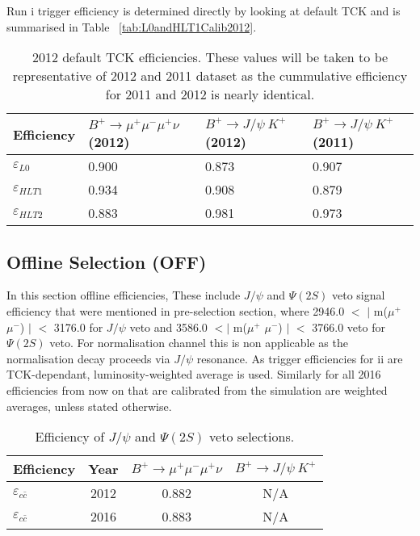 Run \Rn{1} trigger efficiency is determined directly by looking at default TCK and is summarised in Table ~\autoref{tab:L0andHLT1Calib2012}. 



\begin{table}[H]
\begin{center}
\begin{tabular}{ l  l  l  l  }
 Efficiency &  $B^{+} \rightarrow \mu^{+} \mu^{-} \mu^{+} \nu$  (2012)  &  $B^{+} \rightarrow J/\psi\ K^{+}$ (2012) & $B^{+} \rightarrow J/\psi\ K^{+}$ (2011) \\
\hline
$\varepsilon_{L0}$ &0.900 & 0.873 & 0.907 \\
$\varepsilon_{HLT1}$ &0.934 & 0.908 & 0.879 \\
$\varepsilon_{HLT2}$ &0.883 & 0.981 & 0.973 \\
\hline
\end{tabular}
\end{center}
\caption{2012 default TCK efficiencies. These values will be taken to be representative of 2012 and 2011 dataset as the cummulative efficiency for 2011 and 2012 is nearly identical.}
\label{tab:L0andHLT1Calib2012}
\end{table}


\subsection{Offline Selection (OFF)}

In this section offline efficiencies, These include $J/\psi$ and $\Psi(2S)$ veto signal efficiency that were mentioned in pre-selection section, where 2946.0 $<$ $|$ m($\mu^{+}$ $\mu^{-}$) $|$ $<$ 3176.0 for $J/\psi$ veto and 3586.0 $<|$ m($\mu^{+}$ $\mu^{-}$) $|$ $<$ 3766.0 veto for $\Psi(2S)$ veto. For normalisation channel this is non applicable as the normalisation decay proceeds via $J/\psi$ resonance. As trigger efficiencies for \Rn{2} are TCK-dependant, luminosity-weighted average is used. Similarly for all 2016 efficiencies from now on that are calibrated from the simulation are weighted averages, unless stated otherwise.

\begin{table}[H]
\begin{center}
\begin{tabular}{ l c  c  c }
Efficiency & Year &  $B^{+} \rightarrow \mu^{+} \mu^{-} \mu^{+} \nu$  &  $B^{+} \rightarrow J/\psi\ K^{+}$ \\
\hline
$\varepsilon_{c\bar{c}}$ & 2012  &0.882 & N/A \\
$\varepsilon_{c\bar{c}}$ & 2016  &0.883 & N/A \\
\hline
\end{tabular}
\end{center}
\caption{Efficiency of $J/\psi$ and $\Psi(2S)$ veto selections.}
\end{table}

